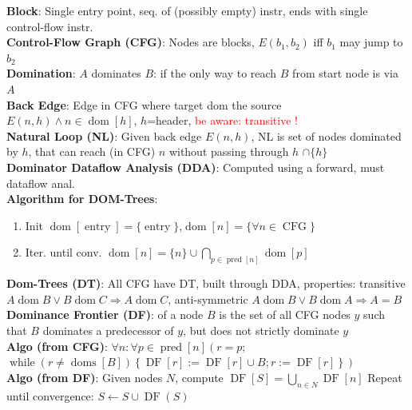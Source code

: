 

\textbf{Block}: Single entry point, seq. of (possibly empty) instr, ends with single control-flow instr.\\
\textbf{Control-Flow Graph (CFG)}: Nodes are blocks, $E(b_1,b_2)$ iff $b_1$ may jump to $b_2$\\
\textbf{Domination}: $A$ dominates $B$: if the only way to reach $B$ from start node is via $A$\\
\textbf{Back Edge}: Edge in CFG where target dom the source $E(n,h) \wedge n \in \operatorname{dom}[h]$, $h$=header, \textcolor{red}{be aware: transitive !} \\
\textbf{Natural Loop (NL)}: Given back edge $E(n,h)$, NL is set of nodes dominated by $h$, that can reach (in CFG) $n$ without passing through $h$ $\cap \{h\}$ \\
\textbf{Dominator Dataflow Analysis (DDA)}: Computed using a forward, must dataflow anal.\\
\textbf{Algorithm for DOM-Trees}: 
\begin{enumerate}[leftmargin = *,noitemsep]
\item  Init $\operatorname{dom}[\operatorname{entry}]=\{\operatorname{entry}\}$,$\operatorname{dom}[n]=\{\forall n \in \operatorname{CFG}\}$
\item Iter. until conv. $\operatorname{dom}[n] = \{n\}\cup \bigcap_{p\in \operatorname{pred}[n]}\operatorname{dom}[p]$
 \end{enumerate}
\textbf{Dom-Trees (DT)}: All CFG have DT, built through DDA, properties: transitive $A  \operatorname{dom} B \vee B  \operatorname{dom} C\Rightarrow A  \operatorname{dom} C$, anti-symmetric $A  \operatorname{dom} B \vee B  \operatorname{dom} A\Rightarrow A = B$\\
\textbf{Dominance Frontier (DF)}: of a node $B$ is the set of all CFG nodes $y$ such
that $B$ dominates a predecessor of $y$, but does not strictly dominate $y$\\
\textbf{Algo (from CFG)}: $\forall n: \forall p \in \operatorname{pred}[n] \left(\right.r = p;$ $ \operatorname{while}(r \neq \operatorname{doms}[B])\left\{ \operatorname{DF}[r]:= \operatorname{DF}[r] \cup B; r:= \operatorname{DF}[r]\right\}\left.\right)$\\
\textbf{Algo (from DF)}: Given nodes $N$, compute $\operatorname{DF}[S]=\bigcup_{n \in N} \operatorname{DF}[n]$ Repeat until convergence: $S \leftarrow S \cup \operatorname{DF}(S)$\\

